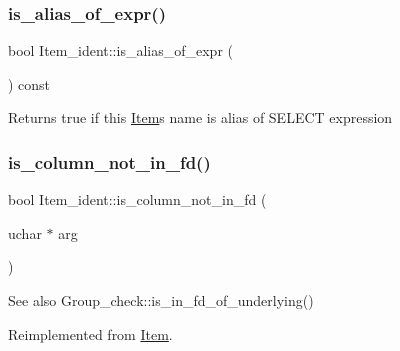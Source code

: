 \subsubsection{\texorpdfstring{is\+\_\+alias\+\_\+of\+\_\+expr()}{is\_alias\_of\_expr()}}
{\footnotesize\ttfamily bool Item\+\_\+ident\+::is\+\_\+alias\+\_\+of\+\_\+expr (\begin{DoxyParamCaption}{ }\end{DoxyParamCaption}) const\hspace{0.3cm}{\ttfamily [inline]}}

\begin{DoxyReturn}{Returns}
true if this \mbox{\hyperlink{classItem}{Item}}\textquotesingle{}s name is alias of S\+E\+L\+E\+CT expression 
\end{DoxyReturn}
\mbox{\label{classItem__ident_ab09d952b5bb33d175d548662fcdc89ef}} 
\subsubsection{\texorpdfstring{is\+\_\+column\+\_\+not\+\_\+in\+\_\+fd()}{is\_column\_not\_in\_fd()}}
{\footnotesize\ttfamily bool Item\+\_\+ident\+::is\+\_\+column\+\_\+not\+\_\+in\+\_\+fd (\begin{DoxyParamCaption}\item[{uchar $\ast$}]{arg }\end{DoxyParamCaption})\hspace{0.3cm}{\ttfamily [virtual]}}

\begin{DoxySeeAlso}{See also}
Group\+\_\+check\+::is\+\_\+in\+\_\+fd\+\_\+of\+\_\+underlying() 
\end{DoxySeeAlso}


Reimplemented from \mbox{\hyperlink{classItem_a24e82d279a8907ad502faebb3abe1ab1}{Item}}.

\mbox{\label{classItem__ident_a3270cc5d558904bbad4c9df6d1c28c70}} 
